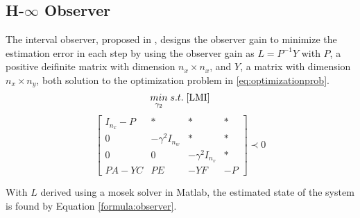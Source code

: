 \subsection{H-$\infty$ Observer}
The interval observer, proposed in \cite{Tang2019}, designs the observer gain to minimize the estimation error in each step by using the observer gain as $L= P^{-1}Y$ with $P$, a positive deifinite matrix with dimension $n_x \times n_x$, and $Y$, a matrix with dimension $n_x \times n_y$, both solution to the optimization problem in \eqref{eq:optimizationprob}.
\begin{equation}
\label{eq:optimizationprob}
\underset{\gamma _2}{min} \;
s.t. \; \eqref{LMI}
\end{equation} 
\begin{equation}
\label{LMI}
\left[\begin{matrix}
I_{n_x} -P & * & * & *\\
0 & -\gamma ^2 I_{n_w} & * &* \\
0 & 0 & -\gamma ^2 I_{n_v} & *\\
PA-YC & PE & -YF & -P
\end{matrix}\right]  \prec 0
\end{equation} 

With $L$ derived using a mosek solver in Matlab\textsuperscript{\tiny\textregistered}, the estimated state of the system is found by Equation \eqref{formula:observer}.
